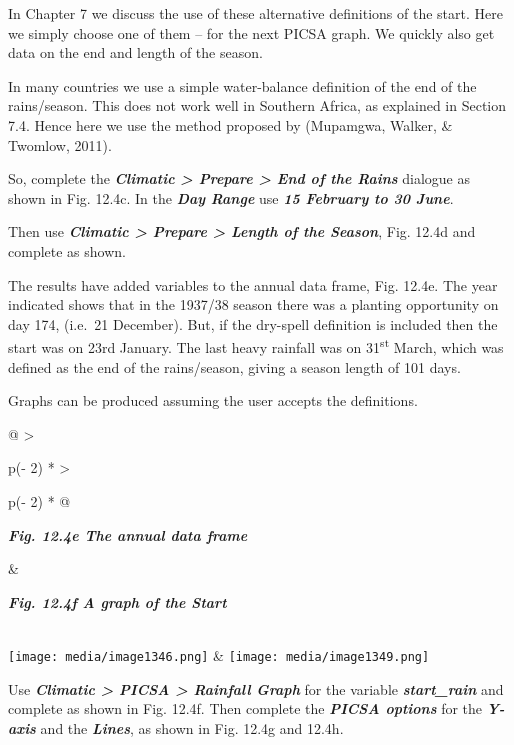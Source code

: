\documentclass[
  letterpaper,
  DIV=11,
  numbers=noendperiod]{scrreprt}
\begin{document}
In Chapter 7 we discuss the use of these alternative definitions of the
start. Here we simply choose one of them -- for the next PICSA graph. We
quickly also get data on the end and length of the season.

In many countries we use a simple water-balance definition of the end of
the rains/season. This does not work well in Southern Africa, as
explained in Section 7.4. Hence here we use the method proposed by
(Mupamgwa, Walker, \& Twomlow, 2011).

So, complete the \textbf{\emph{Climatic \textgreater{} Prepare
\textgreater{} End of the Rains}} dialogue as shown in Fig. 12.4c. In
the \textbf{\emph{Day Range}} use \textbf{\emph{15 February to 30
June}}.

Then use \textbf{\emph{Climatic \textgreater{} Prepare \textgreater{}
Length of the Season}}, Fig. 12.4d and complete as shown.

The results have added variables to the annual data frame, Fig. 12.4e.
The year indicated shows that in the 1937/38 season there was a planting
opportunity on day 174, (i.e.~21 December). But, if the dry-spell
definition is included then the start was on 23rd January. The last
heavy rainfall was on 31\textsuperscript{st} March, which was defined as
the end of the rains/season, giving a season length of 101 days.

Graphs can be produced assuming the user accepts the definitions.

\begin{longtable}[]{@{}
  >{\raggedright\arraybackslash}p{(\columnwidth - 2\tabcolsep) * }
  >{\raggedright\arraybackslash}p{(\columnwidth - 2\tabcolsep) * }@{}}
\toprule\noalign{}
\begin{minipage}[b]{\linewidth}\raggedright
\textbf{\emph{Fig. 12.4e The annual data frame}}
\end{minipage} & \begin{minipage}[b]{\linewidth}\raggedright
\textbf{\emph{Fig. 12.4f A graph of the Start}}
\end{minipage} \\
\midrule\noalign{}
\endhead
\bottomrule\noalign{}
\endlastfoot
\texttt{[image: media/image1346.png]} &
\texttt{[image: media/image1349.png]} \\
\end{longtable}

Use \textbf{\emph{Climatic \textgreater{} PICSA \textgreater{} Rainfall
Graph}} for the variable \textbf{\emph{start\_rain}} and complete as
shown in Fig. 12.4f. Then complete the \textbf{\emph{PICSA options}} for
the \textbf{\emph{Y-axis}} and the \textbf{\emph{Lines}}, as shown in
Fig. 12.4g and 12.4h.
\end{document}
